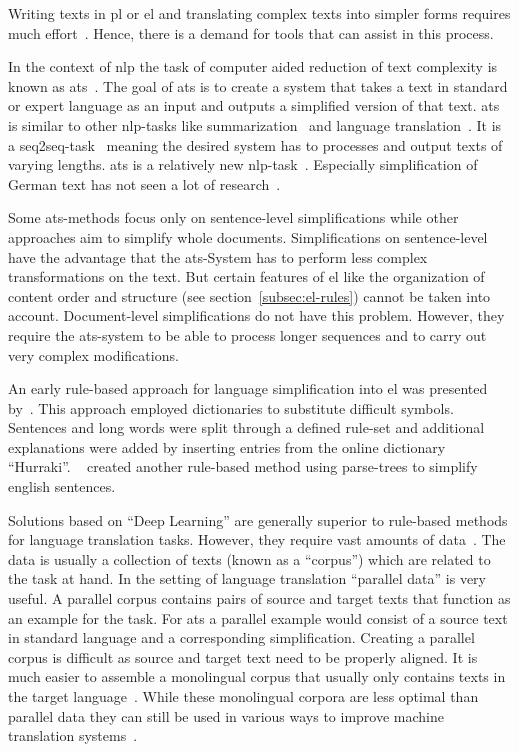 Writing texts in \gls{pl} or \gls{el} and translating complex texts into simpler forms requires much effort~\autocite{easyLanguageBook}.
Hence, there is a demand for tools that can assist in this process.

In the context of \gls{nlp} the task of computer aided reduction of text complexity is known as \gls{ats}~\autocite{Ansch_tz_2023}.
The goal of \gls{ats} is to create a system that takes a text in standard or expert language as an input and outputs a simplified version of that text.
\gls{ats} is similar to other \gls{nlp}-tasks like summarization~\autocite{rios-etal-2021-new} and language translation~\autocite{aumiller2022klexikon}.
It is a \gls{seq2seq}-task~\autocite{Ansch_tz_2023} meaning the desired system has to processes and output texts of varying lengths.
\gls{ats} is a relatively new \gls{nlp}-task~\autocite{schomacker2023data}.
Especially simplification of German text has not seen a lot of research~\autocite{Ansch_tz_2023}.

Some \gls{ats}-methods focus only on sentence-level simplifications while other approaches aim to simplify whole documents.
Simplifications on sentence-level have the advantage that the \gls{ats}-System has to perform less complex transformations on the text.
But certain features of \gls{el} like the organization of content order and structure (see section~\ref{subsec:el-rules}) cannot be taken into account. %
Document-level simplifications do not have this problem.
However, they require the \gls{ats}-system to be able to process longer sequences and to carry out very complex modifications.

An early rule-based approach for language simplification into \gls{el} was presented by~\autocite{suter2016}.
This approach employed dictionaries to substitute difficult symbols.
Sentences and long words were split through a defined rule-set and additional explanations were added by inserting entries from the online dictionary \enquote{Hurraki}.
~\autocite{Garain2019} created another rule-based method using parse-trees to simplify english sentences.

Solutions based on \enquote{Deep Learning} are generally superior to rule-based methods for language translation tasks.
However, they require vast amounts of data~\autocite{otter2019survey}.
The data is usually a collection of texts (known as a \enquote{corpus}) which are related to the task at hand.
In the setting of language translation \enquote{parallel data} is very useful.
A parallel corpus contains pairs of source and target texts that function as an example for the task.
For \gls{ats} a parallel example would consist of a source text in standard language and a corresponding simplification.
Creating a parallel corpus is difficult as source and target text need to be properly aligned.
It is much easier to assemble a monolingual corpus that usually only contains texts in the target language~\autocite{chan2023routledge}.
While these monolingual corpora are less optimal than parallel data they can still be used in various ways to improve machine translation systems~\autocite{lample2018unsupervised, burlot2019using, chan2023routledge}.

